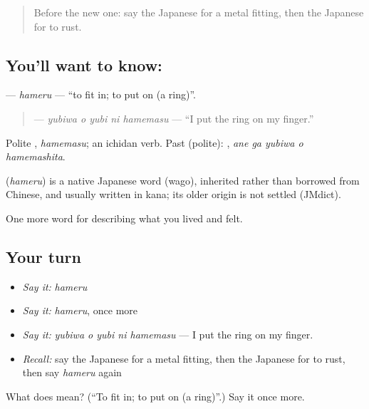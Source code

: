 \begin{quote}
Before the new one: say the Japanese for a metal fitting, then the Japanese for to rust.
\end{quote}

\subsection*{You'll want to know: }
\textbf{} — \emph{hameru} — \textquotedblleft{}to fit in; to put on (a ring)\textquotedblright{}.

\begin{quote}
\textbf{  } — \emph{yubiwa o yubi ni hamemasu} — \textquotedblleft{}I put the ring on my finger.\textquotedblright{}
\end{quote}

Polite \textbf{}, \emph{hamemasu}; an ichidan verb. Past (polite): \textbf{  }, \emph{ane ga yubiwa o hamemashita}.

\begin{cousinweb}
\textbf{} (\emph{hameru}) is a native Japanese word (wago), inherited rather than borrowed from Chinese, and usually written in kana; its older origin is not settled (JMdict).
\end{cousinweb}

\begin{grammarlens}[title={What you've built}]
One more word for describing what you lived and felt.
\end{grammarlens}

\subsection*{Your turn}
\begin{itemize}
\raggedright
  \item \emph{Say it:} \emph{hameru}
  \item \emph{Say it:} \emph{hameru}, once more
  \item \emph{Say it:} \emph{yubiwa o yubi ni hamemasu} — I put the ring on my finger.
  \item \emph{Recall:} say the Japanese for a metal fitting, then the Japanese for to rust, then say \emph{hameru} again
\end{itemize}

\begin{tcolorbox}[breakable,colback=teal!4,colframe=teal!35!black,title={Before you move on}]
What does  mean? (\textquotedblleft{}To fit in; to put on (a ring)\textquotedblright{}.) Say it once more.
\end{tcolorbox}
